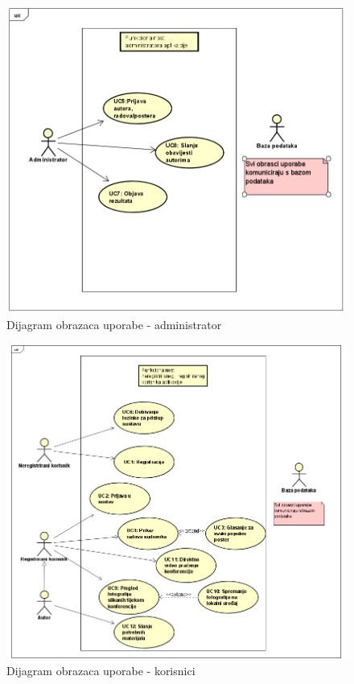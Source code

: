 					\begin{figure}[H]
						\includegraphics[scale=0.6]{slike/uc dijagram admin.PNG} %
						\centering
						\caption{Dijagram obrazaca uporabe - administrator}
						\label{fig:promjene}
					\end{figure}
					\begin{figure}[H]
						\includegraphics[scale=0.6]{slike/uc dijagram registrirani i neregistrirani korisnik.PNG} %
						\centering
						\caption{Dijagram obrazaca uporabe - korisnici}
						\label{fig:promjene}
					\end{figure}
				\eject		
				
